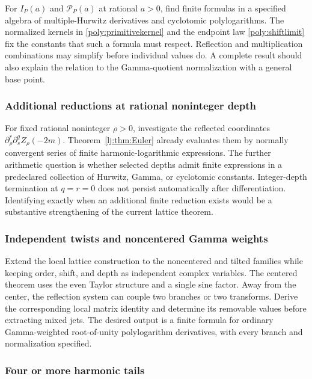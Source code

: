 \documentclass[11pt,a4paper]{article}
\numberwithin{equation}{section}
\theoremstyle{definition}
\theoremstyle{remark}
\begin{document}
For $I_P(a)$ and $\mathcal P_P(a)$ at rational $a>0$, find finite
formulas in a specified algebra of multiple-Hurwitz derivatives and
cyclotomic polylogarithms. The normalized kernels in
\eqref{poly:primitivekernel} and the endpoint law
\eqref{poly:shiftlimit} fix the constants that such a formula must
respect. Reflection and multiplication combinations may simplify before
individual values do. A complete result should also explain the relation
to the Gamma-quotient normalization with a general base point.

\subsubsection{Additional reductions at rational noninteger depth}

For fixed rational noninteger $\rho>0$, investigate the reflected
coordinates $\partial_\rho^r\partial_s^qZ_\rho(-2m)$.
Theorem~\ref{lj:thm:Euler} already evaluates them by normally convergent
series of finite harmonic-logarithmic expressions. The further
arithmetic question is whether selected depths admit finite expressions
in a predeclared collection of Hurwitz, Gamma, or cyclotomic constants.
Integer-depth termination at $q=r=0$ does not persist automatically
after differentiation. Identifying exactly when an additional finite
reduction exists would be a substantive strengthening of the current
lattice theorem.

\subsubsection{Independent twists and noncentered Gamma weights}

Extend the local lattice construction to the noncentered and tilted
families while keeping order, shift, and depth as independent complex
variables. The centered theorem uses the even Taylor structure and a
single sine factor. Away from the center, the reflection system can
couple two branches or two transforms. Derive the corresponding local
matrix identity and determine its removable values before extracting
mixed jets. The desired output is a finite formula for ordinary
Gamma-weighted root-of-unity polylogarithm derivatives, with every
branch and normalization specified.

\subsubsection{Four or more harmonic tails}
\end{document}
